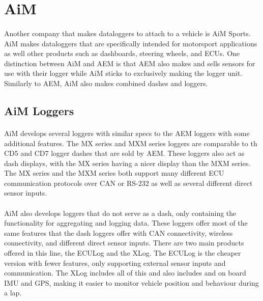\section{AiM}

\paragraph{}
Another company that makes dataloggers to attach to a vehicle is AiM Sports.
AiM makes dataloggers that are specifically intended for motorsport applications as well other products such as dashboards, steering wheels, and ECUs.
One distinction between AiM and AEM is that AEM also makes and sells sensors for use with their logger while AiM sticks to exclusively making the logger unit.
Similarly to AEM, AiM also makes combined dashes and loggers.

\subsection{AiM Loggers}

\paragraph{}
AiM develops several loggers with similar specs to the AEM loggers with some additional features.
The MX series and MXM series loggers are comparable to th CD5 and CD7 logger dashes that are sold by AEM.
These loggers also act as dash displays, with the MX series having a nicer display than the MXM series.
The MX series and the MXM series both support many different ECU communication protocols over CAN or RS-232 as well as several different direct sensor inputs.


\paragraph{}
AiM also develops loggers that do not serve as a dash, only containing the functionality for aggregating and logging data.
These loggers offer most of the same features that the dash loggers offer with CAN connectivity, wireless connectivity, and different direct sensor inputs.
There are two main products offered in this line, the ECULog and the XLog.
The ECULog is the cheaper version with fewer features, only supporting external sensor inputs and communication.
The XLog includes all of this and also includes and on board IMU and GPS, making it easier to monitor vehicle position and behaviour during a lap.